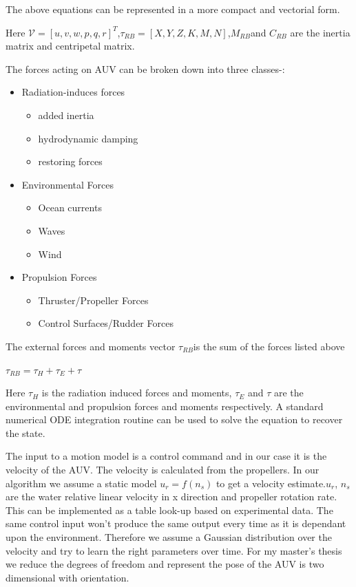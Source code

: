 \documentclass[12pt]{dalcsthesis}
\begin{document}
The above equations can be represented in a more compact and vectorial
form.


Here $\mathcal{V}=[u,v,w,p,q,r]^{T}$,$\tau_{RB}=[X,Y,Z,K,M,N]$,$M_{RB}$and
$C_{RB}$ are the inertia matrix and centripetal matrix. 

The forces acting on AUV can be broken down into three classes-:
\begin{itemize}
\item Radiation-induces forces

\begin{itemize}
\item added inertia
\item hydrodynamic damping
\item restoring forces
\end{itemize}
\item Environmental Forces

\begin{itemize}
\item Ocean currents
\item Waves
\item Wind
\end{itemize}
\item Propulsion Forces

\begin{itemize}
\item Thruster/Propeller Forces
\item Control Surfaces/Rudder Forces
\end{itemize}
\end{itemize}
The external forces and moments vector $\tau_{RB}$is the sum of the
forces listed above 

$\tau_{RB}=\tau_{H}+\tau_{E}+\tau$

Here $\tau_{H}$ is the radiation induced forces and moments, $\tau_{E}$
and $\tau$ are the environmental and propulsion forces and moments respectively. 
A standard numerical ODE integration routine can be used to solve the equation to recover the state.

The input to a motion model is a control command and in our case it is the velocity of the AUV. The velocity is calculated from the propellers. In our algorithm we assume a static model $u_{r}=f(n_{s})$ to get a velocity estimate.$u_{r}$, $n_{s}$ are the water relative linear velocity in x direction and propeller rotation rate. This can be implemented as a table look-up based on experimental data.
The same control input won't produce the same output every time as it is dependant upon the environment. Therefore we assume a Gaussian distribution over the velocity and try to learn the right parameters over time. 
For my master's thesis we reduce the degrees of freedom and represent the pose of the AUV is two dimensional with orientation. 
\end{document}
